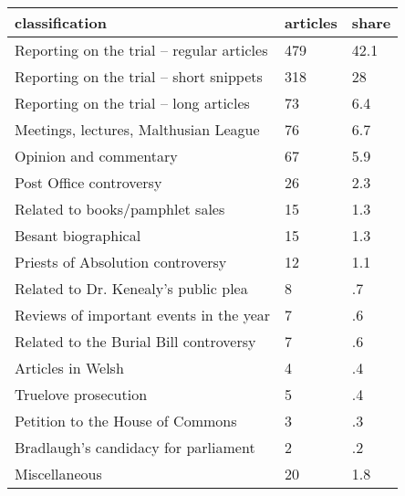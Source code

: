 \documentclass{article}
\begin{document}
\begin{table}[tbp] \centering
{}

\begin{tabularx}{\linewidth}{@{}lCC@{}}

\toprule
{classification}&{articles}&{share} \tabularnewline
\midrule \addlinespace[\belowrulesep]
Reporting on the trial – regular articles&479&42.1 \tabularnewline
Reporting on the trial – short snippets&318&28 \tabularnewline
Reporting on the trial – long articles&73&6.4 \tabularnewline
Meetings, lectures, Malthusian League&76&6.7 \tabularnewline
Opinion and commentary&67&5.9 \tabularnewline
Post Office controversy&26&2.3 \tabularnewline
Related to books/pamphlet sales&15&1.3 \tabularnewline
Besant biographical&15&1.3 \tabularnewline
Priests of Absolution controversy&12&1.1 \tabularnewline
Related to Dr. Kenealy’s public plea&8&.7 \tabularnewline
Reviews of important events in the year&7&.6 \tabularnewline
Related to the Burial Bill controversy&7&.6 \tabularnewline
Articles in Welsh&4&.4 \tabularnewline
Truelove prosecution&5&.4 \tabularnewline
Petition to the House of Commons&3&.3 \tabularnewline
Bradlaugh’s candidacy for parliament&2&.2 \tabularnewline
Miscellaneous&20&1.8 \tabularnewline
\bottomrule 

\end{tabularx}
\end{table}
\end{document}
